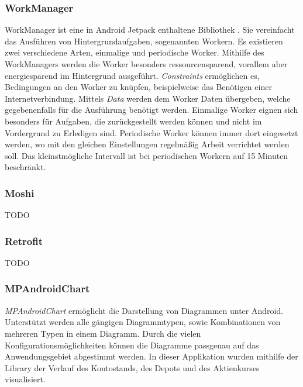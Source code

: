 \documentclass[a4paper]{article}
\begin{document}
\subsubsection{WorkManager}
\label{subsubsec:technologies:bibs:workmanager}
WorkManager ist eine in Android Jetpack enthaltene Bibliothek \autocite{android_workmanager}. Sie vereinfacht das Ausführen von Hintergrundaufgaben, sogenannten Workern. Es existieren zwei verschiedene Arten, einmalige und periodische Worker. Mithilfe des WorkManagers werden die Worker besonders ressourcensparend, vorallem aber energiesparend im Hintergrund ausgeführt. \textit{Constraints} ermöglichen es, Bedingungen an den Worker zu knüpfen, beispielweise das Benötigen einer Internetverbindung. Mittels \textit{Data} werden dem Worker Daten übergeben, welche gegebenenfalls für die Ausführung benötigt werden. Einmalige Worker eignen sich besonders für Aufgaben, die zurückgestellt werden können und nicht im Vordergrund zu Erledigen sind. Periodische Worker können immer dort eingesetzt werden, wo mit den gleichen Einstellungen regelmäßig Arbeit verrichtet werden soll. Das kleinstmögliche Intervall ist bei periodischen Workern auf 15 Minuten beschränkt.


\subsubsection{Moshi}
\label{subsubsec:technologies:bibs:moshi}
TODO


\subsubsection{Retrofit}
\label{subsubsec:technologies:bibs:retrofit}
TODO


\subsubsection{MPAndroidChart}
\label{subsubsec:technologies:bibs:mpandroidchart}
\textit{MPAndroidChart} \autocite{mpandroidchart} ermöglicht die Darstellung von Diagrammen unter Android. Unterstützt werden alle gängigen Diagrammtypen, sowie Kombinationen von mehreren Typen in einem Diagramm. Durch die vielen Konfigurationsmöglichkeiten können die Diagramme passgenau auf das Anwendungsgebiet abgestimmt werden. In dieser Applikation wurden mithilfe der Library der Verlauf des Kontostands, des Depots und des Aktienkurses visualisiert.
\end{document}
